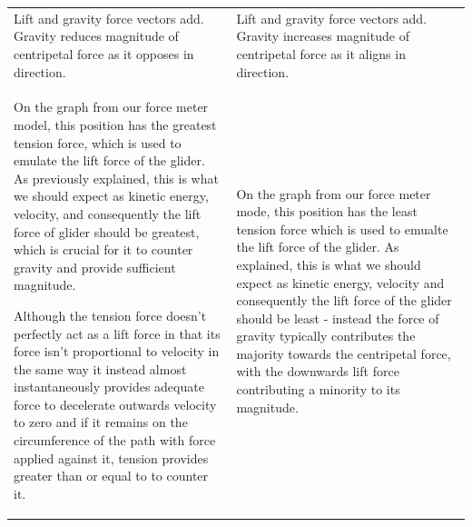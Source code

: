 \documentclass[11pt, a4paper]{article}
\begin{document}
\begin{table}[H]
\begin{tabularx}{\textwidth}{|>{\raggedright\arraybackslash}X|||>{\raggedright\arraybackslash}X|}
{				\begin{align}
					\vec{F_c} &= \vec{F_L} + \vec{F_g} \\
					|\vec{F_c}| &= |\vec{F_L}| + |\vec{F_g}|
				\end{align}
			}\\
			\hline
			Lift and gravity force vectors add. Gravity reduces magnitude of centripetal force as it opposes in direction.
			&
			Lift and gravity force vectors add. Gravity increases magnitude of centripetal force as it aligns in direction.\\
			\hline
			On the graph from our force meter model, this position has the greatest tension force, which is used to emulate the lift force of the glider. As previously explained, this is what we should expect as kinetic energy, velocity, and consequently the lift force of glider should be greatest, which is crucial for it to counter gravity and provide sufficient magnitude.
			
			\vspace{\baselineskip}
			Although the tension force doesn't perfectly act as a lift force in that its force isn't proportional to velocity in the same way it instead almost instantaneously provides adequate force to decelerate outwards velocity to zero and if it remains on the circumference of the path with force applied against it, tension provides greater than or equal to to counter it.
			&
			On the graph from our force meter mode, this position has the least tension force which is used to emualte the lift force of the glider. As explained, this is what we should expect as kinetic energy, velocity and consequently the lift force of the glider should be least - instead the force of gravity typically contributes the majority towards the centripetal force, with the downwards lift force contributing a minority to its magnitude.\\
			\hline
		\end{tabularx}
	\end{table}
	
\end{document}

